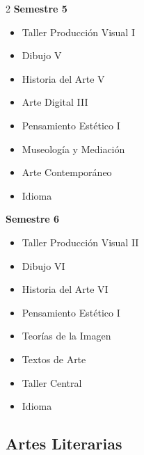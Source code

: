 \documentclass[12pt,a4paper]{article}
\begin{document}
\begin{multicols}{2}
		\textbf{Semestre 5}
		\begin{itemize}
			\item Taller Producción Visual I
			\item Dibujo V
			\item Historia del Arte V
			\item Arte Digital III
			\item Pensamiento Estético I
			\item Museología y Mediación
			\item Arte Contemporáneo
			\item Idioma
		\end{itemize}
		
		\textbf{Semestre 6}
		\begin{itemize}
			\item Taller Producción Visual II
			\item Dibujo VI
			\item Historia del Arte VI
			\item Pensamiento Estético I
			\item Teorías de la Imagen
			\item Textos de Arte
			\item Taller Central
			\item Idioma
		\end{itemize}
	\end{multicols}
	
	\newpage
	
	\subsection{Artes Literarias}
	
\end{document}
